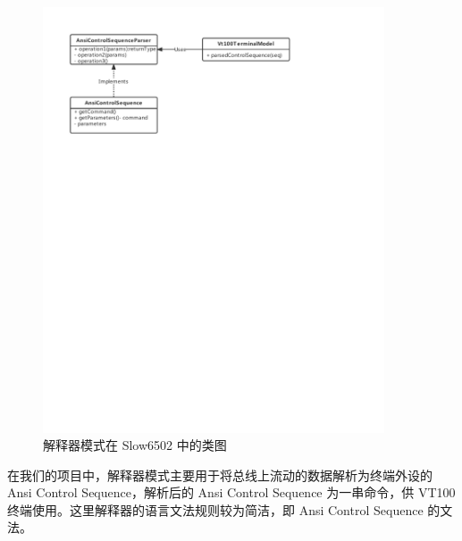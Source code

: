 \begin{figure}[H]
    \centering
    \includegraphics[width=0.9\textwidth]{figures/Interpreter.pdf}
    \caption{解释器模式在 Slow6502 中的类图}
\end{figure}

在我们的项目中，解释器模式主要用于将总线上流动的数据解析为终端外设的 Ansi Control Sequence，解析后的 Ansi Control Sequence 为一串命令，供 VT100 终端使用。这里解释器的语言文法规则较为简洁，即 Ansi Control Sequence 的文法。
